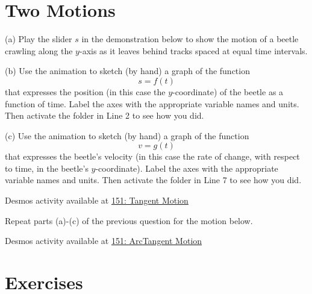 \documentclass{ximera}
\begin{document}
\section*{Two Motions}
\begin{question}  \label{Q09dg000}
(a) Play the slider $s$ in the demonstration below to show the motion of a beetle crawling along the $y$-axis as it leaves behind tracks spaced at equal time intervals.

(b) Use the animation to sketch (by hand) a graph of the function
\[
     s = f(t)
\]
that expresses the position (in this case the $y$-coordinate) of the beetle as a function of time. Label the axes with the appropriate variable names and units. Then activate the folder in Line 2 to see how you did.

(c) Use the animation to sketch (by hand) a graph of the function
\[
     v= g(t)
\]
that expresses the beetle's velocity (in this case the rate of change, with respect to time, in the beetle's $y$-coordinate). Label the axes with the appropriate variable names and units. Then activate the folder in Line 7 to see how you did.


\begin{onlineOnly}
    \begin{center}
\end{center}
\end{onlineOnly}

Desmos activity available at \href{https://www.desmos.com/calculator/srotstrdzm}{151: Tangent Motion}

\end{question}


\begin{question}  \label{Qdf5555}
Repeat parts (a)-(c) of the previous question for the motion below.

\begin{onlineOnly}
    \begin{center}
\end{center}
\end{onlineOnly}

Desmos activity available at \href{https://www.desmos.com/calculator/h6vq21lfql}{151: ArcTangent Motion}


\end{question}



\section*{Exercises}
\end{document}
